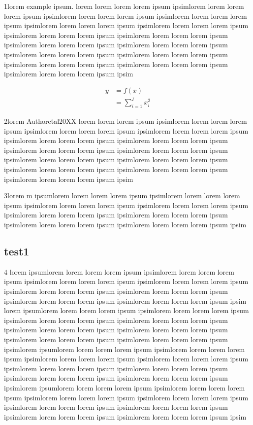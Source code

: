 \label{intro}

1lorem \gls{example} ipsum. lorem lorem lorem lorem ipsum ipsimlorem lorem lorem lorem ipsum ipsimlorem lorem lorem lorem ipsum ipsimlorem lorem lorem lorem ipsum ipsimlorem lorem lorem lorem ipsum ipsimlorem lorem lorem lorem ipsum ipsimlorem lorem lorem lorem ipsum ipsimlorem lorem lorem lorem ipsum ipsimlorem lorem lorem lorem ipsum ipsimlorem lorem lorem lorem ipsum ipsimlorem lorem lorem lorem ipsum ipsimlorem lorem lorem lorem ipsum ipsimlorem lorem lorem lorem ipsum ipsimlorem lorem lorem lorem ipsum ipsimlorem lorem lorem lorem ipsum ipsim

\begin{align}
    y &= f(x)\\
    &= \sum_{i=1}^I x_i^2
\end{align}

2lorem Authoretal20XX lorem lorem lorem ipsum ipsimlorem lorem lorem lorem ipsum ipsimlorem lorem lorem lorem ipsum ipsimlorem lorem lorem lorem ipsum ipsimlorem lorem lorem lorem ipsum ipsimlorem lorem lorem lorem ipsum ipsimlorem lorem lorem lorem ipsum ipsimlorem lorem lorem lorem ipsum ipsimlorem lorem lorem lorem ipsum ipsimlorem lorem lorem lorem ipsum ipsimlorem lorem lorem lorem ipsum ipsimlorem lorem lorem lorem ipsum ipsimlorem lorem lorem lorem ipsum ipsim

3lorem \gls{m}  ipsumlorem lorem lorem lorem ipsum ipsimlorem lorem lorem lorem ipsum ipsimlorem lorem lorem lorem ipsum ipsimlorem lorem lorem lorem ipsum ipsimlorem lorem lorem lorem ipsum ipsimlorem lorem lorem lorem ipsum ipsimlorem lorem lorem lorem ipsum ipsimlorem lorem lorem lorem ipsum ipsim

\subsection{test1}
4 lorem ipsumlorem lorem lorem lorem ipsum ipsimlorem lorem lorem lorem ipsum ipsimlorem lorem lorem lorem ipsum ipsimlorem lorem lorem lorem ipsum ipsimlorem lorem lorem lorem ipsum ipsimlorem lorem lorem lorem ipsum ipsimlorem lorem lorem lorem ipsum ipsimlorem lorem lorem lorem ipsum ipsim lorem ipsumlorem lorem lorem lorem ipsum ipsimlorem lorem lorem lorem ipsum ipsimlorem lorem lorem lorem ipsum ipsimlorem lorem lorem lorem ipsum ipsimlorem lorem lorem lorem ipsum ipsimlorem lorem lorem lorem ipsum ipsimlorem lorem lorem lorem ipsum ipsimlorem lorem lorem lorem ipsum ipsimlorem ipsumlorem lorem lorem lorem ipsum ipsimlorem lorem lorem lorem ipsum ipsimlorem lorem lorem lorem ipsum ipsimlorem lorem lorem lorem ipsum ipsimlorem lorem lorem lorem ipsum ipsimlorem lorem lorem lorem ipsum ipsimlorem lorem lorem lorem ipsum ipsimlorem lorem lorem lorem ipsum ipsimlorem ipsumlorem lorem lorem lorem ipsum ipsimlorem lorem lorem lorem ipsum ipsimlorem lorem lorem lorem ipsum ipsimlorem lorem lorem lorem ipsum ipsimlorem lorem lorem lorem ipsum ipsimlorem lorem lorem lorem ipsum ipsimlorem lorem lorem lorem ipsum ipsimlorem lorem lorem lorem ipsum ipsim

